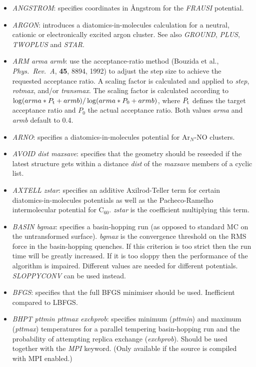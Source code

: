 \documentclass[12pt,a4paper,dvips]{article}
\begin{document}
\begin{itemize}
\item {\it ANGSTROM\/}: specifies coordinates in \AA ngstrom for the {\it FRAUSI\/}
potential.

\item {\it ARGON\/}: introduces a diatomics-in-molecules calculation for
a neutral, cationic or electronically excited argon cluster. See also
{\it GROUND\/}, {\it PLUS\/}, {\it TWOPLUS\/} and {\it STAR\/}.

\item{\it ARM arma armb}: use the acceptance-ratio method (Bouzida et al., {\it Phys.~Rev.~A},
{\bf 45}, 8894, 1992)  to adjust the step size to achieve the requested 
acceptance ratio. A scaling factor is calculated and applied to {\it step}, {\it rotmax},
and/or {\it transmax}. The scaling factor is calculated according to 
$\log(arma*P_{\rm t}+armb)/\log(arma*P_0+armb)$, where $P_{\rm t}$ defines the
target acceptance ratio and $P_0$ the actual acceptance ratio. Both values {\it arma} and
{\it armb} default to 0.4.

\item {\it ARNO\/}: specifies a diatomics-in-molecules potential for Ar$_N$-NO clusters.

\item {\it AVOID dist maxsave}: specifies that the geometry should be reseeded if the
latest structure gets within a distance {\it dist} of the {\it maxsave} members of a
cyclic list.

\item {\it AXTELL zstar\/}: specifies an additive Axilrod-Teller term for certain
diatomics-in-molecules potentials as well as the Pacheco-Ramelho intermolecular potential for
C$_{60}$.\cite{pachecor97} 
{\it zstar\/} is the coefficient multiplying this term.

\item {\it BASIN bgmax\/}: specifies a basin-hopping run (as opposed to standard MC
on the untransformed surface). {\it bgmax\/} is the convergence threshold
on the RMS force in the basin-hopping
quenches. If this criterion is too strict then the run time will be greatly increased.
If it is too sloppy then the performance of the algorithm is impaired. Different values
are needed for different potentials. {\it SLOPPYCONV} can be used instead.

\item {\it BFGS}: specifies that the full BFGS minimiser should be used. Inefficient compared to LBFGS.

\item {\it BHPT pttmin pttmax exchprob\/}: specifies minimum ({\it pttmin\/}) and maximum 
({\it pttmax\/}) temperatures
for a parallel tempering basin-hopping run and the probability of attempting replica
exchange ({\it exchprob\/}). Should be used together with the {\it MPI\/} keyword.
(Only available if the source is compiled with MPI enabled.)  


\end{itemize}
\end{document}
